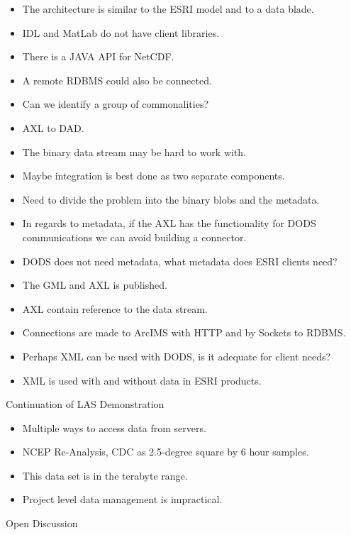 \begin{itemize}
\item The architecture is similar to the ESRI model and to a data blade.
\item IDL and MatLab do not have client libraries.
\item There is a JAVA API for NetCDF.
\item A remote RDBMS could also be connected.
\item Can we identify a group of commonalities?
\item AXL to DAD.
\item The binary data stream may be hard to work with.
\item Maybe integration is best done as two separate components.
\item Need to divide the problem into the binary blobs and the metadata.
\item In regards to metadata, if the AXL has the functionality for DODS communications we 
can avoid building a connector.
\item DODS does not need metadata, what metadata does ESRI clients need?
\item The GML and AXL is published.
\item AXL contain reference to the data stream.
\item Connections are made to ArcIMS with HTTP and by Sockets to RDBMS.
\item Perhaps XML can be used with DODS, is it adequate for client needs?
\item XML is used with and without data in ESRI products.
\end{itemize}




        Continuation of LAS Demonstration

\begin{itemize}
\item Multiple ways to access data from servers.
\item NCEP Re-Analysis, CDC as 2.5-degree square by 6 hour samples.
\item This data set is in the terabyte range.
\item Project level data management is impractical.
\end{itemize}

        Open Discussion

